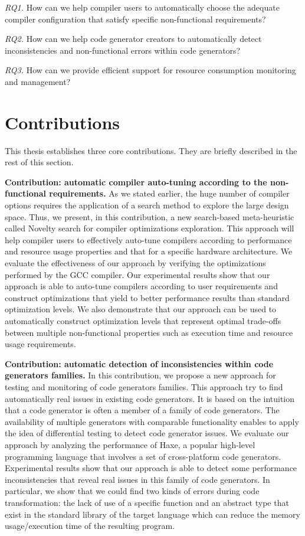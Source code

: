 \textit{RQ1.} How can we help compiler users to automatically choose the adequate compiler configuration that satisfy specific non-functional requirements?

\textit{RQ2.} How can we help code generator creators to automatically detect inconsistencies and non-functional errors within code generators?

\textit{RQ3.} How can we provide efficient support for resource consumption monitoring and management?


\section{Contributions}
This thesis establishes three core contributions. They are briefly described in the rest of this section.

\textbf{Contribution: automatic compiler auto-tuning according to the non-functional requirements.}
As we stated earlier, the huge number of compiler options requires the application of a search method to explore the large design space. Thus, we present, in this contribution, a new search-based meta-heuristic called Novelty search for compiler optimizations exploration. This approach will help compiler users to effectively auto-tune compilers according to performance and resource usage properties and that for a specific hardware architecture. 
We evaluate the effectiveness of our approach by verifying the optimizations performed by the GCC compiler.
Our experimental results show that our approach is able to auto-tune compilers according to user requirements and construct optimizations that yield to better performance results than standard optimization levels. We also demonstrate that our approach can be used to automatically construct optimization levels that represent optimal trade-offs between multiple non-functional properties such as execution time and resource usage requirements.

\textbf{Contribution: automatic detection of inconsistencies within code generators families.}
In this contribution, we propose a new approach for testing and monitoring of code generators families. This approach try to find automatically real issues in existing code generators. 
It is based on the intuition that a code generator is often a member of a family of code generators. The availability of multiple generators with comparable functionality enables to apply the idea of differential testing\cite{mckeeman1998differential} to detect code generator issues.
We evaluate our approach by analyzing the performance of Haxe, a popular high-level programming language that involves a set of cross-platform code generators. Experimental results show that our approach is able to detect some performance inconsistencies that reveal real issues in this family of code generators.
In particular, we show that we could find two kinds of errors during code transformation: the lack of use of a specific function and an abstract type that exist in the standard library of the target language which can reduce the memory usage/execution time of the resulting program.

